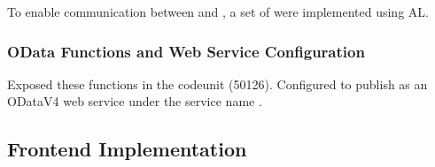 To enable communication between  and
, a set of 
were implemented using AL.

\subsubsection*{OData Functions and Web Service Configuration}

Exposed these functions in the  codeunit (50126).
Configured  to publish  as an ODataV4 web service under the service name
.

\subsection{Frontend Implementation}


